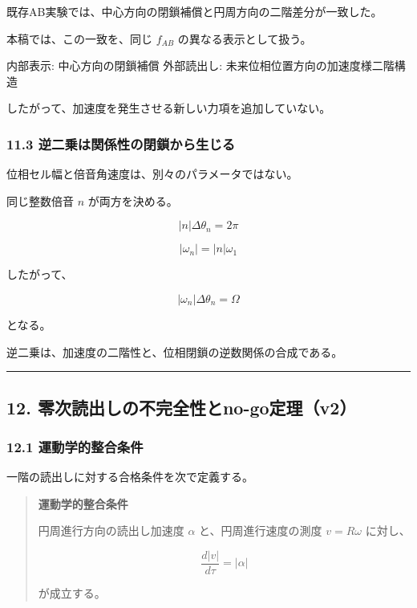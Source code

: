 \documentclass[
  a4paper,
]{ltjsarticle}
\newenvironment{Shaded}{}{}
\newcommand{\NormalTok}[1]{#1}
\begin{document}
既存AB実験では、中心方向の閉鎖補償と円周方向の二階差分が一致した。

本稿では、この一致を、同じ \(f_{AB}\) の異なる表示として扱う。

\begin{Shaded}
\begin{Highlighting}[]
\NormalTok{内部表示: 中心方向の閉鎖補償}
\NormalTok{外部読出し: 未来位相位置方向の加速度様二階構造}
\end{Highlighting}
\end{Shaded}

したがって、加速度を発生させる新しい力項を追加していない。

\subsubsection{11.3
逆二乗は関係性の閉鎖から生じる}\label{ux9006ux4e8cux4e57ux306fux95a2ux4fc2ux6027ux306eux9589ux9396ux304bux3089ux751fux3058ux308b}

位相セル幅と倍音角速度は、別々のパラメータではない。

同じ整数倍音 \(n\) が両方を決める。

\[
|n|\Delta\theta_n=2\pi
\]

\[
|\omega_n|=|n|\omega_1
\]

したがって、

\[
|\omega_n|\Delta\theta_n=\Omega
\]

となる。

逆二乗は、加速度の二階性と、位相閉鎖の逆数関係の合成である。

\begin{center}\rule{0.5\linewidth}{0.5pt}\end{center}

\subsection{12.
零次読出しの不完全性とno-go定理（v2）}\label{ux96f6ux6b21ux8aadux51faux3057ux306eux4e0dux5b8cux5168ux6027ux3068no-goux5b9aux7406v2}

\subsubsection{12.1
運動学的整合条件}\label{ux904bux52d5ux5b66ux7684ux6574ux5408ux6761ux4ef6}

一階の読出しに対する合格条件を次で定義する。

\begin{quote}
\textbf{運動学的整合条件}

円周進行方向の読出し加速度 \(\alpha\) と、円周進行速度の測度
\(v=R\omega\) に対し、

\[
\frac{d\lvert v\rvert}{d\tau}=\lvert\alpha\rvert
\]

が成立する。
\end{quote}
\end{document}
